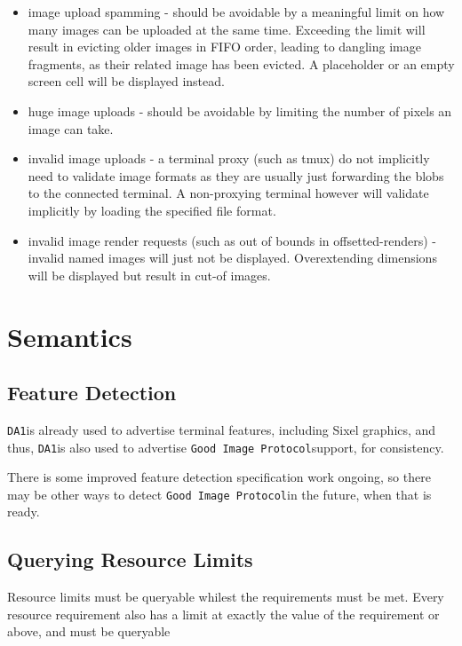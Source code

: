 \documentclass[a4paper]{article}
\newcommand{\code}[1]{\colorbox{light-gray}{\texttt{#1}}}
\newcommand{\DA}{\code{DA1}}
\newcommand{\GoodImageProtocol}{\code{Good Image Protocol}}
\begin{document}
\begin{itemize}
    \item image upload spamming - should be avoidable by a meaningful limit
        on how many images can be uploaded at the same time.
        Exceeding the limit will result in evicting older images in FIFO order,
        leading to dangling image fragments, as their related image has been
        evicted. A placeholder or an empty screen cell will be displayed instead.
    \item huge image uploads - should be avoidable by limiting the number
        of pixels an image can take.
    \item invalid image uploads - a terminal proxy (such as tmux) do not
        implicitly need to validate image formats as they are usually just
        forwarding the blobs to the connected terminal. A non-proxying
        terminal however will validate implicitly by loading the specified
        file format.
    \item invalid image render requests (such as out of bounds in offsetted-renders) -
        invalid named images will just not be displayed.
        Overextending dimensions will be displayed but result in cut-of images.
\end{itemize}

\section{Semantics} %
\subsection{Feature Detection} %

\DA is already used to advertise terminal features, including Sixel graphics, and thus,
\DA is also used to advertise \GoodImageProtocol support, for consistency.

There is some improved feature detection specification work ongoing,
so there may be other ways to detect \GoodImageProtocol in the future, when that is ready.

\subsection{Querying Resource Limits} %

Resource limits must be queryable whilest the requirements must be met.
Every resource requirement also has a limit at exactly
the value of the requirement or above, and must be queryable
\end{document}
